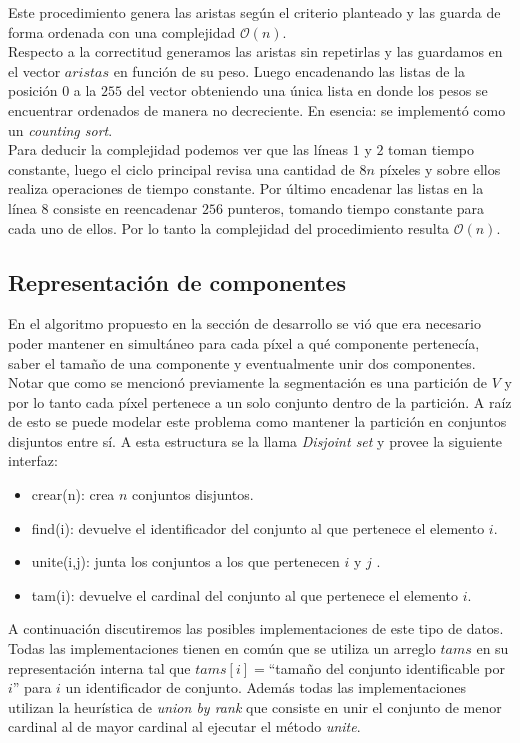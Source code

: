 \indent Este procedimiento genera las aristas seg\'un el criterio planteado y las guarda de forma ordenada con una complejidad $\mathcal{O}(n)$. \\
\indent Respecto a la correctitud generamos las aristas sin repetirlas y las guardamos en el vector $aristas$ en función de su peso. Luego encadenando las listas de la posici\'on $0$ a la $255$ del vector obteniendo una \'unica lista en donde los pesos se encuentrar ordenados de manera no decreciente. En esencia: se implement\'o como un \textit{counting sort}. \\
Para deducir la complejidad podemos ver que las l\'ineas $1$ y $2$ toman tiempo constante, luego el ciclo principal revisa una cantidad de $8n$ píxeles y sobre ellos realiza operaciones de tiempo constante. Por último encadenar las listas en la l\'inea $8$ consiste en reencadenar $256$ punteros, tomando tiempo constante para cada uno de ellos. Por lo tanto la complejidad del procedimiento resulta $\mathcal{O}(n)$. 

\subsection{Representaci\'on de componentes}
En el algoritmo propuesto en la secci\'on de desarrollo se vi\'o que era necesario poder mantener en simultáneo para cada píxel a qué componente pertenec\'ia, saber el tama\~no de una componente y eventualmente unir dos componentes. Notar que como se mencion\'o previamente la segmentaci\'on es una partici\'on de $V$ y por lo tanto cada píxel pertenece a un solo conjunto dentro de la partici\'on. A raíz de esto se puede modelar este problema como mantener la partici\'on en conjuntos disjuntos entre sí. A esta estructura se la llama \textit{Disjoint set} y provee la siguiente interfaz:
\begin{itemize}	
	\item crear(n): crea $n$ conjuntos disjuntos.
	\item find(i): devuelve el identificador del conjunto al que pertenece el elemento $i$.
	\item unite(i,j): junta los conjuntos a los que pertenecen $i$ y $j$ .
	\item tam(i): devuelve el cardinal del conjunto al que pertenece el elemento $i$.
\end{itemize}

A continuaci\'on discutiremos las posibles implementaciones de este tipo de datos. Todas las implementaciones tienen en com\'un que se utiliza un arreglo $tams$ en su representaci\'on interna tal que $tams[i]=$``tama\~no del conjunto identificable por $i$'' para $i$ un identificador de conjunto. Además todas las implementaciones utilizan la heurística de \textit{union by rank} que consiste en unir el conjunto de menor cardinal al de mayor cardinal al ejecutar el m\'etodo \textit{unite}.


